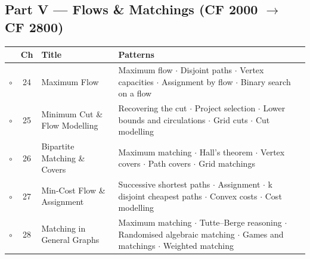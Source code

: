 \subsection*{Part V --- Flows \& Matchings (CF 2000 $\to$ CF 2800)}
\begin{tabularx}{\linewidth}{@{}c c >{\raggedright\arraybackslash}p{3.6cm} X@{}}
\toprule
& \textbf{Ch} & \textbf{Title} & \textbf{Patterns} \\
\midrule
$\circ$ & 24 & Maximum Flow & Maximum flow $\cdot$ Disjoint paths $\cdot$ Vertex capacities $\cdot$ Assignment by flow $\cdot$ Binary search on a flow \\
$\circ$ & 25 & Minimum Cut \& Flow Modelling & Recovering the cut $\cdot$ Project selection $\cdot$ Lower bounds and circulations $\cdot$ Grid cuts $\cdot$ Cut modelling \\
$\circ$ & 26 & Bipartite Matching \& Covers & Maximum matching $\cdot$ Hall's theorem $\cdot$ Vertex covers $\cdot$ Path covers $\cdot$ Grid matchings \\
$\circ$ & 27 & Min-Cost Flow \& Assignment & Successive shortest paths $\cdot$ Assignment $\cdot$ k disjoint cheapest paths $\cdot$ Convex costs $\cdot$ Cost modelling \\
$\circ$ & 28 & Matching in General Graphs & Maximum matching $\cdot$ Tutte--Berge reasoning $\cdot$ Randomised algebraic matching $\cdot$ Games and matchings $\cdot$ Weighted matching \\
\bottomrule
\end{tabularx}

